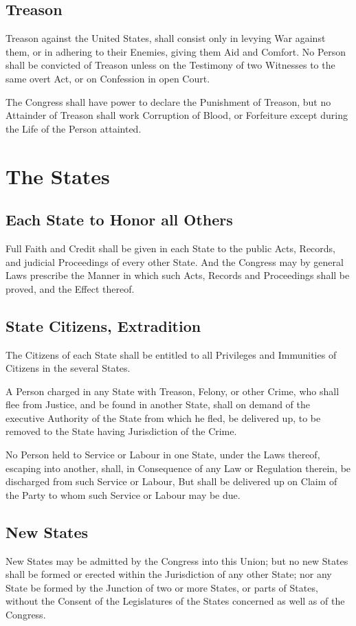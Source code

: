 \documentclass{constitution}
\begin{document}
\section{Treason}
Treason against the United States, shall consist only in levying War against them,
or in adhering to their Enemies, giving them Aid and Comfort.
No Person shall be convicted of Treason
unless on the Testimony of two Witnesses to the same overt Act,
or on Confession in open Court.

The Congress shall have power to declare the Punishment of Treason,
but no Attainder of Treason shall work Corruption of Blood, or Forfeiture
except during the Life of the Person attainted.

\chapter{The States}
\section{Each State to Honor all Others}
Full Faith and Credit shall be given in each State
to the public Acts, Records, and judicial Proceedings of every other State.
And the Congress may by general Laws prescribe the Manner
in which such Acts, Records and Proceedings shall be proved, and the Effect thereof.

\section{State Citizens, Extradition}
The Citizens of each State shall be entitled
to all Privileges and Immunities of Citizens in the several States.

A Person charged in any State with Treason, Felony, or other Crime,
who shall flee from Justice, and be found in another State,
shall on demand of the executive Authority of the State from which he fled,
be delivered up, to be removed to the State having Jurisdiction of the Crime.

No Person held to Service or Labour in one State, under the Laws thereof,
escaping into another,
shall, in Consequence of any Law or Regulation therein,
be discharged from such Service or Labour,
But shall be delivered up on Claim of the Party to whom such Service or Labour may be due.

\section{New States}
New States may be admitted by the Congress into this Union;
but no new States shall be formed or erected within the Jurisdiction of any other State;
nor any State be formed by the Junction of two or more States, or parts of States,
without the Consent of the Legislatures of the States concerned as well as of the Congress.
\end{document}
